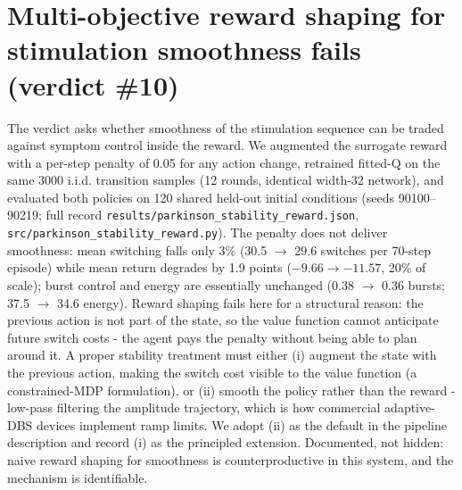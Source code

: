 \section{Multi-objective reward shaping for stimulation smoothness fails (verdict \#10)}
The verdict asks whether smoothness of the stimulation sequence can be traded against
symptom control inside the reward. We augmented the surrogate reward with a per-step
penalty of 0.05 for any action change, retrained fitted-Q on the same 3000 i.i.d.
transition samples (12 rounds, identical width-32 network), and evaluated both policies
on 120 shared held-out initial conditions (seeds 90100--90219; full record
\texttt{results/parkinson\_stability\_reward.json}, \texttt{src/parkinson\_stability\_reward.py}).
The penalty does not deliver smoothness: mean switching falls only 3\%
(30.5 $\to$ 29.6 switches per 70-step episode) while mean return degrades by 1.9 points
($-9.66 \to -11.57$, 20\% of scale); burst control and energy are essentially unchanged
(0.38 $\to$ 0.36 bursts; 37.5 $\to$ 34.6 energy). Reward shaping fails here for a
structural reason: the previous action is not part of the state, so the value function
cannot anticipate future switch costs - the agent pays the penalty without being able to
plan around it. A proper stability treatment must either (i) augment the state with the
previous action, making the switch cost visible to the value function (a constrained-MDP
formulation), or (ii) smooth the policy rather than the reward - low-pass filtering the
amplitude trajectory, which is how commercial adaptive-DBS devices implement ramp
limits. We adopt (ii) as the default in the pipeline description and record (i) as the
principled extension. Documented, not hidden: naive reward shaping for smoothness is
counterproductive in this system, and the mechanism is identifiable.


